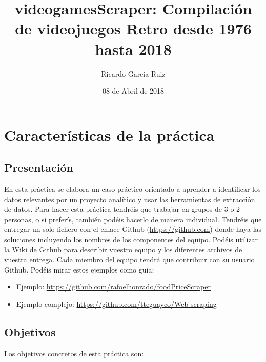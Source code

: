 \documentclass[]{article}
\title{videogamesScraper: Compilación de videojuegos Retro desde 1976 hasta
2018}
\author{Ricardo Garcia Ruiz}
\date{08 de Abril de 2018}
\providecommand{\tightlist}{%
  \setlength{\itemsep}{0pt}\setlength{\parskip}{0pt}}
\begin{document}
\maketitle

{
\setcounter{tocdepth}{3}
\tableofcontents
}
\section{Características de la
práctica}\label{caracteristicas-de-la-practica}

\subsection{Presentación}\label{presentacion}

En esta práctica se elabora un caso práctico orientado a aprender a
identificar los datos relevantes por un proyecto analítico y usar las
herramientas de extracción de datos. Para hacer esta práctica tendréis
que trabajar en grupos de 3 o 2 personas, o si preferís, también podéis
hacerlo de manera individual. Tendréis que entregar un solo fichero con
el enlace Github (\url{https://github.com}) donde haya las soluciones
incluyendo los nombres de los componentes del equipo. Podéis utilizar la
Wiki de Github para describir vuestro equipo y los diferentes archivos
de vuestra entrega. Cada miembro del equipo tendrá que contribuir con su
usuario Github. Podéis mirar estos ejemplos como guía:

\begin{itemize}
\tightlist
\item
  Ejemplo: \url{https://github.com/rafoelhonrado/foodPriceScraper}
\item
  Ejemplo complejo: \url{https://github.com/tteguayco/Web-scraping}
\end{itemize}

\subsection{Objetivos}\label{objetivos}

Los objetivos concretos de esta práctica son:
\end{document}

